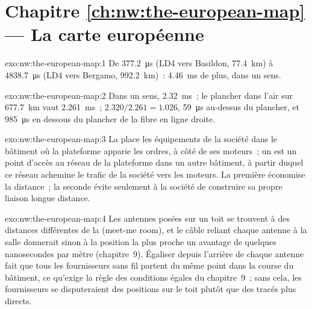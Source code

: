 \section*{Chapitre \ref{ch:nw:the-european-map} --- La carte européenne}

\begin{solution}{exo:nw:the-european-map:1}
De \qty{377.2}{\micro\second} (LD4 vers Basildon, \qty{77.4}{\kilo\metre}) à \qty{4838.7}{\micro\second} (LD4 vers Bergamo,
\qty{992.2}{\kilo\metre})~: \qty{4.46}{\milli\second} de plus, dans un sens.
\end{solution}

\begin{solution}{exo:nw:the-european-map:2}
Dans un sens, \qty{2.32}{\milli\second}~; le plancher dans l'air sur \qty{677.7}{\kilo\metre} vaut \qty{2.261}{\milli\second}~; $2.320/2.261 = 1.026$,
\qty{59}{\micro\second} au-dessus du plancher, et \qty{985}{\micro\second} en dessous du plancher de la fibre en ligne droite.
\end{solution}

\begin{solution}{exo:nw:the-european-map:3}
La  place les équipements de la société dans le bâtiment où la plateforme apparie les ordres, à côté de ses moteurs~; un  est un point d'accès
au réseau de la plateforme dans un autre bâtiment, à partir duquel ce réseau achemine le trafic de la société vers les moteurs. La première économise la
distance~; la seconde évite seulement à la société de construire sa propre liaison longue distance.
\end{solution}

\begin{solution}{exo:nw:the-european-map:4}
Les antennes posées sur un toit se trouvent à des distances différentes de la  (meet-me room), et le câble reliant chaque antenne à la salle donnerait sinon
à la position la plus proche un avantage de quelques nanosecondes par mètre (chapitre~9). Égaliser depuis l'arrière de chaque antenne fait que tous les fournisseurs sans fil
partent du même point dans la course du bâtiment, ce qu'exige la règle des conditions égales du chapitre~9~; sans cela, les fournisseurs
se disputeraient des positions sur le toit plutôt que des tracés plus directs.
\end{solution}

